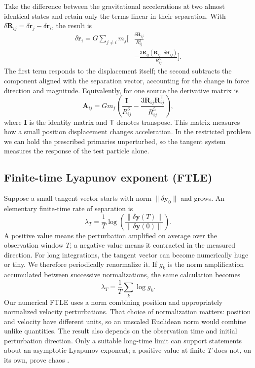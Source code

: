 \documentclass[10pt,letterpaper,twocolumn]{article}
\begin{document}
Take the difference between the gravitational accelerations at two almost identical states and retain only the terms linear in their separation. With $\delta\boldsymbol R_{ij}=\delta\boldsymbol r_j-\delta\boldsymbol r_i$, the result is
\begin{align}\label{eq:tangent}
 \delta\ddot{\boldsymbol r}_i=G\sum_{j\ne i}m_j\bigg[
 &\frac{\delta\boldsymbol R_{ij}}{R_{ij}^3}\\[-0.4em]
 &-\frac{3\boldsymbol R_{ij}(\boldsymbol R_{ij}\cdot\delta\boldsymbol R_{ij})}{R_{ij}^5}\bigg].\nonumber
\end{align}
The first term responds to the displacement itself; the second subtracts the component aligned with the separation vector, accounting for the change in force direction and magnitude. Equivalently, for one source the derivative matrix is
\begin{equation}
 \boldsymbol A_{ij}=Gm_j\left(\frac{\boldsymbol I}{R_{ij}^3}
 -\frac{3\boldsymbol R_{ij}\boldsymbol R_{ij}^{\mathsf T}}{R_{ij}^5}\right),
\end{equation}
where $\boldsymbol I$ is the identity matrix and $\mathsf T$ denotes transpose. This matrix measures how a small position displacement changes acceleration. In the restricted problem we can hold the prescribed primaries unperturbed, so the tangent system measures the response of the test particle alone.

\subsection{Finite-time Lyapunov exponent (FTLE)}
Suppose a small tangent vector starts with norm $\lVert\delta\boldsymbol y_0\rVert$ and grows. An elementary finite-time rate of separation is
\begin{equation}
 \lambda_T=\frac1T\log\!\left(
 \frac{\lVert\delta\boldsymbol y(T)\rVert}{\lVert\delta\boldsymbol y(0)\rVert}
 \right).
\end{equation}
A positive value means the perturbation amplified on average over the observation window $T$; a negative value means it contracted in the measured direction. For long integrations, the tangent vector can become numerically huge or tiny. We therefore periodically renormalize it. If $g_k$ is the norm amplification accumulated between successive normalizations, the same calculation becomes
\begin{equation}\label{eq:ftle}
 \boxed{\lambda_T=\frac1T\sum_k\log g_k.}
\end{equation}
Our numerical FTLE uses a norm combining position and appropriately normalized velocity perturbations. That choice of normalization matters: position and velocity have different units, so an unscaled Euclidean norm would combine unlike quantities. The result also depends on the observation time and initial perturbation direction. Only a suitable long-time limit can support statements about an asymptotic Lyapunov exponent; a positive value at finite $T$ does not, on its own, prove chaos \cite{benettin1980lyapunov1,benettin1980lyapunov2}.
\end{document}
